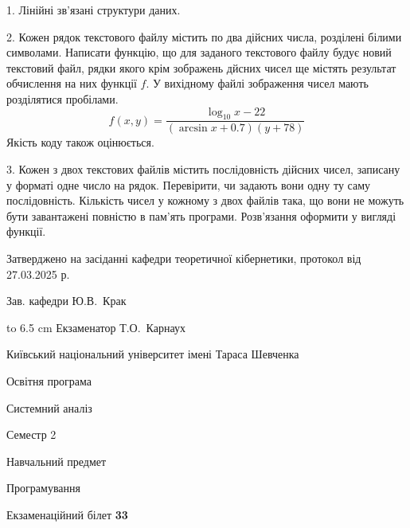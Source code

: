 \documentclass[12pt, ukrainian]{article}
\begin{document}
{%
1. Лінійні зв’язані структури даних.%
\par
\vspace{2mm}

2. Кожен рядок текстового файлу містить по два дійсних числа, розділені білими символами.
Написати функцію, що для заданого текстового файлу будує новий текстовий файл, рядки якого крім зображень дйсних чисел ще містять результат обчислення на них функції $f$. У вихідному файлі зображення чисел мають розділятися пробілами. 
$$f(x, y) =\frac{\log_{10} x - 22}{(\arcsin x + 0.7) (y + 78)}$$ 
Якість коду також оцінюється.

\par
\vspace{2mm}

3. Кожен з двох текстових файлів містить послідовність дійсних чисел, записану у форматі одне число на рядок.  Перевірити, чи задають вони одну ту саму послідовність. Кількість чисел у кожному з двох файлів така, що вони не можуть бути завантажені повністю в пам'ять програми. Розв'язання оформити у вигляді функції.

}
{\smallskip\smallskip \begin {scriptsize} Затверджено на засіданні кафедри теоретичної кібернетики, протокол   від   27.03.2025 р.\par\smallskip\smallskip\smallskip\smallskip
{\parbox {6.5 cm} {Зав. кафедри \dotfill Ю.В.~Крак}}\hspace {0.7cm} {\hbox to 6.5 cm { Екзаменатор \dotfill Т.О.~Карнаух}} \end{scriptsize}}
\newpage
{{\begin {scriptsize}\par
{ \center  Київський національний університет імені Тараса Шевченка \par}
{\parbox {5 cm}{Освітня програма \hfill}{\parbox {7 cm}{Системний аналіз\hfill}}\parbox {6 cm}{\hfill Семестр 2}}\par
{\parbox {5 cm} {Навчальний предмет \hfill}\parbox {7 cm}{Програмування \hfill}\parbox {6cm}{\hfill}\par}\vspace{-15pt} \end{scriptsize}}{\center Екзаменаційний білет \No \textbf { 33 }\par}}
\end{document}
